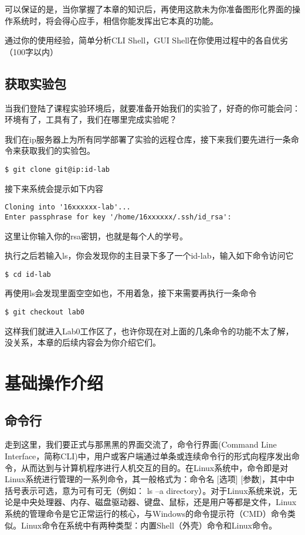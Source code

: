 可以保证的是，当你掌握了本章的知识后，再使用这款未为你准备图形化界面的操作系统时，将会得心应手，相信你能发挥出它本真的功能。

\begin{thinking}\label{think-Shell简析}
通过你的使用经验，简单分析CLI Shell，GUI Shell在你使用过程中的各自优劣（100字以内）
\end{thinking}

\subsection{获取实验包}

当我们登陆了课程实验环境后，就要准备开始我们的实验了，好奇的你可能会问：环境有了，工具有了，我们在哪里完成实验呢？

我们在ip服务器上为所有同学部署了实验的远程仓库，接下来我们要先进行一条命令来获取我们的实验包。
\begin{verbatim}
$ git clone git@ip:id-lab
\end{verbatim}
接下来系统会提示如下内容
\begin{verbatim}
Cloning into '16xxxxxx-lab'...
Enter passphrase for key '/home/16xxxxxx/.ssh/id_rsa':
\end{verbatim}
这里让你输入你的rsa密钥，也就是每个人的学号。

执行之后若输入ls，你会发现你的主目录下多了一个id-lab，输入如下命令访问它
\begin{verbatim}
$ cd id-lab
\end{verbatim}
再使用ls会发现里面空空如也，不用着急，接下来需要再执行一条命令
\begin{verbatim}
$ git checkout lab0
\end{verbatim}
这样我们就进入Lab0工作区了，也许你现在对上面的几条命令的功能不太了解，没关系，本章的后续内容会为你介绍它们。

\section{基础操作介绍}
\subsection{命令行}
走到这里，我们要正式与那黑黑的界面交流了，命令行界面(Command Line Interface，简称CLI)中，用户或客户端通过单条或连续命令行的形式向程序发出命令，从而达到与计算机程序进行人机交互的目的。在Linux系统中，命令即是对Linux系统进行管理的一系列命令，其一般格式为：命令名 [选项] [参数]，其中中括号表示可选，意为可有可无（例如： ls –a directory）。对于Linux系统来说，无论是中央处理器、内存、磁盘驱动器、键盘、鼠标，还是用户等都是文件，Linux系统的管理命令是它正常运行的核心，与Windows的命令提示符（CMD）命令类似。Linux命令在系统中有两种类型：内置Shell（外壳）命令和Linux命令。

